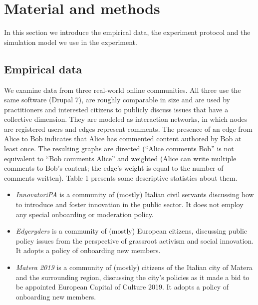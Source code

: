 \section{Material and methods}

In this section we introduce the empirical data, the experiment protocol and the simulation model we use in the experiment. 

\subsection{Empirical data}

We examine data from three real-world online communities. All three use the same software (Drupal 7), are roughly comparable in size and are used by practitioners and interested citizens to publicly discuss issues that have a collective dimension. They are modeled as interaction networks, in which nodes are registered users and edges represent comments. The presence of an edge from Alice to Bob indicates that Alice has commented content authored by Bob at least once. The resulting graphs are directed (“Alice comments Bob” is not equivalent to “Bob comments Alice” and weighted (Alice can write multiple comments to Bob's content; the edge's weight is equal to the number of comments written). Table 1 presents some descriptive statistics about them. 

\begin{itemize}
\item \emph{InnovatoriPA} is a community of (mostly) Italian civil servants discussing how to introduce and foster innovation in the public sector. It does not employ any special onboarding or moderation policy.
\item \emph{Edgeryders} is a community of (mostly) European citizens, discussing public policy issues from the perspective of grassroot activism and social innovation. It adopts a policy of onboarding new members.
\item \emph{Matera 2019} is a community of (mostly) citizens of the Italian city of Matera and the surrounding region, discussing the city's policies as it made a bid to be appointed European Capital of Culture 2019. It adopts a policy of onboarding new members.
\end{itemize}


